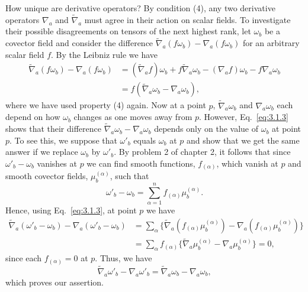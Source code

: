 How unique are derivative operators? By condition (4), any two derivative operators $\nabla_a$ and $\widetilde\nabla_a$ must agree in their action on scalar fields. To investigate their possible
disagreements on tensors of the next highest rank, let $\omega_b$ be a covector field and
consider the difference $\widetilde\nabla_a(f\omega_b)-\nabla_a(f\omega_b)$ for an arbitrary scalar field $f$. By the
Leibniz rule we have
\begin{equation}
  \begin{aligned}
    \widetilde\nabla_a(f\omega_b)-\nabla_a(f\omega_b)
    &=(\widetilde\nabla_af)\omega_b+f\widetilde\nabla_a\omega_b
      -(\nabla_af)\omega_b-f\nabla_a\omega_b\\
    &=f(\widetilde\nabla_a\omega_b-\nabla_a\omega_b),
  \end{aligned}
  \tag{3.1.3}\label{eq:3.1.3}
\end{equation}
where we have used property (4) again. Now at a point $p$, $\widetilde\nabla_a\omega_b$ and
$\nabla_a\omega_b$ each depend on how $\omega_b$ changes as one moves away from $p$. However,
Eq.~\eqref{eq:3.1.3} shows that their difference $\widetilde\nabla_a\omega_b-\nabla_a\omega_b$ depends only on the value of $\omega_b$ at point $p$. To see
this, we suppose that $\omega'_b$ equals $\omega_b$ at $p$ and show that we get the same answer if we
replace $\omega_b$ by $\omega'_b$. By problem 2 of chapter 2, it follows that since $\omega'_b-\omega_b$ vanishes
at $p$ we can find smooth functions, $f_{(\alpha)}$, which vanish at $p$ and smooth covector
fields, $\mu_b^{(\alpha)}$, such that
\begin{equation}
  \omega'_b-\omega_b=\sum_{\alpha=1}^{n}f_{(\alpha)}\mu_b^{(\alpha)}.
  \tag{3.1.4}\label{eq:3.1.4}
\end{equation}
Hence, using Eq.~\eqref{eq:3.1.3}, at point $p$ we have
\begin{equation}
  \begin{aligned}
    \widetilde\nabla_a(\omega'_b-\omega_b)-\nabla_a(\omega'_b-\omega_b)
    &=\sum_\alpha\bigl\{\widetilde\nabla_a(f_{(\alpha)}\mu_b^{(\alpha)})
      -\nabla_a(f_{(\alpha)}\mu_b^{(\alpha)})\bigr\}\\
    &=\sum_\alpha f_{(\alpha)}
      \bigl\{\widetilde\nabla_a\mu_b^{(\alpha)}-\nabla_a\mu_b^{(\alpha)}\bigr\}=0,
  \end{aligned}
  \tag{3.1.5}\label{eq:3.1.5}
\end{equation}
since each $f_{(\alpha)}=0$ at $p$. Thus, we have
\begin{equation}
  \widetilde\nabla_a\omega'_b-\nabla_a\omega'_b
  =\widetilde\nabla_a\omega_b-\nabla_a\omega_b,
  \tag{3.1.6}\label{eq:3.1.6}
\end{equation}
which proves our assertion.

